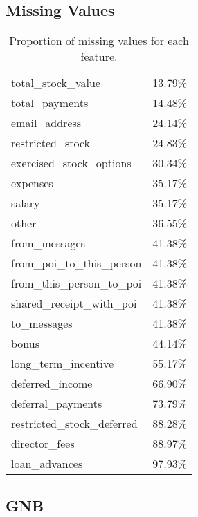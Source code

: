 \documentclass{article}
\begin{document}
\subsection{Missing Values}
\begin{table}[H]
\centering
\caption{Proportion of missing values for each feature.}
\label{tab:missing}
\begin{tabular}{ll}
\hline
 total\_stock\_value         & 13.79\% \\
 total\_payments            & 14.48\% \\
 email\_address             & 24.14\% \\
 restricted\_stock          & 24.83\% \\
 exercised\_stock\_options   & 30.34\% \\
 expenses                  & 35.17\% \\
 salary                    & 35.17\% \\
 other                     & 36.55\% \\
 from\_messages             & 41.38\% \\
 from\_poi\_to\_this\_person   & 41.38\% \\
 from\_this\_person\_to\_poi   & 41.38\% \\
 shared\_receipt\_with\_poi   & 41.38\% \\
 to\_messages               & 41.38\% \\
 bonus                     & 44.14\% \\
 long\_term\_incentive       & 55.17\% \\
 deferred\_income           & 66.90\% \\
 deferral\_payments         & 73.79\% \\
 restricted\_stock\_deferred & 88.28\% \\
 director\_fees             & 88.97\% \\
 loan\_advances             & 97.93\% \\
\hline
\end{tabular}
\end{table}

\subsection{GNB}
\end{document}
